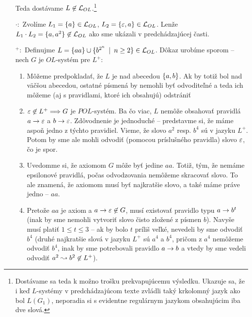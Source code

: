 \begin{dokaz}
\begin{itemize}
        Teda dostávame $L \not\in \mathcal{L}_{OL}$.\footnote{
        Dostávame sa
        teda k možno trošku prekvapujúcemu výsledku. Ukazuje sa, že i keď
        $L$-systémy v predchádzajúcom texte zvládli taký krkolomný jazyk
        ako bol $L(G_{1})$, neporadia si s evidentne regulárnym jazykom
        obsahujúcim iba dve slová.
        }

    \item[$\cdot:$] Zvolíme $L_1 = \{a\} \in \mathcal{L}_{OL}$,
        $L_2 = \{\varepsilon, a\} \in \mathcal{L}_{OL}$. Lenže
        $L_1 \cdot L_2=\{a, a^2\} \not\in \mathcal{L}_{OL}$
        ako sme ukázali v predchádzajúcej časti.

    \item[$ ^+:$] Definujme 
        $L=\{aa\} \cup \{b^{2^n} \enspace |\enspace n \ge 2\} \in\mathcal{L}_{OL}$.
        Dôkaz urobíme sporom -- nech $G$ je $OL$-systém pre $L^{+}$:

        \begin{enumerate}
        \item Môžeme predpokladať, že $L$ je nad abecedou $\{a,b\}$.
            Ak by totiž bol nad väčšou abecedou, ostatné písmená
            by nemohli byť odvoditeľné a teda ich môžeme (aj s
            pravidlami, ktoré ich obsahujú) odstrániť

        \item $\varepsilon \not \in L^{+} \Longrightarrow G$ je $POL$-systém. Ba čo
            viac, $L$ nemôže obsahovať pravidlá $a \rightarrow \varepsilon$ a
            $b \rightarrow \varepsilon$. Zdôvodnenie je jednoduché --
            predstavme si, že máme aspoň jedno z týchto pravidiel.
            Vieme, že slovo $a^2$ resp. $b^4$ sú v jazyku $L^{+}$.
            Potom by sme ale mohli odvodiť (pomocou príslušného
            pravidla) slovo $\varepsilon$, čo je spor.

        \item Uvedomme si, že axiomom $G$ môže byť jedine $aa$.
            Totiž, tým, že nemáme epsilonové pravidlá,
            počas odvodzovania nemôžeme skracovať slovo.
            To ale znamená, že axiomom musí byť najkratšie slovo, a
            také máme práve jedno -- $aa$.

        \item Pretože $aa$ je axiom a ${a \rightarrow \varepsilon} \not \in G$,
            musí existovať pravidlo typu
            $a \rightarrow b^t$ (inak by sme nemohli vytvoriť
            slovo čisto zložené z písmen $b$).
            Navyše musí platiť $1 \le t \le 3$ -- ak by bolo $t$ príliš
            veľké, nevedeli by sme odvodiť $b^4$ (druhé najkratšie
            slová v jazyku $L^{+}$ sú $a^4$ a $b^4$,
            pričom z $a^4$ nemôžeme odvodiť $b^4$, inak by sme
            potrebovali pravidlo $a \rightarrow b$ a vtedy by sme vedeli
            odvodiť ${a^2 \leadsto b^2} \not \in L^{+}$).


\end{enumerate}
\end{itemize}
\end{dokaz}
